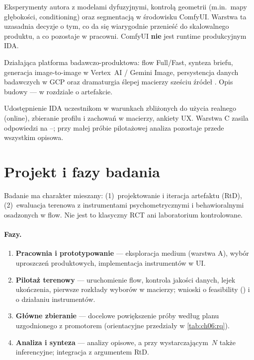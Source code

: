 \begin{description}[style=nextline]
  \item[(A) Praktyka pracowni / ComfyUI]
  Eksperymenty autora z modelami dyfuzyjnymi, kontrolą geometrii (m.in.\ mapy głębokości, conditioning) oraz segmentacją w środowisku ComfyUI. Warstwa ta uzasadnia decyzje o tym, co da się wiarygodnie przenieść do skalowalnego produktu, a co pozostaje w pracowni. ComfyUI \textbf{nie} jest runtime produkcyjnym IDA.

  \item[(B) Artefakt IDA]
  Działająca platforma badawczo-produktowa: flow Full/Fast, synteza briefu, generacja image-to-image w Vertex~AI / Gemini Image, persystencja danych badawczych w GCP oraz dramaturgia ślepej macierzy sześciu źródeł \parencite{idaPlatform2026}. Opis budowy --- w rozdziale o artefakcie.

  \item[(C) Ewaluacja terenowa]
  Udostępnienie IDA uczestnikom w warunkach zbliżonych do użycia realnego (online), zbieranie profilu i zachowań w macierzy, ankiety UX. Warstwa C zasila odpowiedzi na --; przy małej próbie pilotażowej analiza pozostaje przede wszystkim opisowa.
\end{description}

\section{Projekt i fazy badania}
\label{ch06:sec:projekt}

Badanie ma charakter mieszany: (1)~projektowanie i iteracja artefaktu (RtD), (2)~ewaluacja terenowa z instrumentami psychometrycznymi i behawioralnymi osadzonych w flow. Nie jest to klasyczny RCT ani laboratorium kontrolowane.

\paragraph{Fazy.}
\begin{enumerate}
  \item \textbf{Pracownia i prototypowanie} --- eksploracja medium (warstwa A), wybór uproszczeń produktowych, implementacja instrumentów w UI.
  \item \textbf{Pilotaż terenowy} --- uruchomienie flow, kontrola jakości danych, lejek ukończenia, pierwsze rozkłady wyborów w macierzy; wnioski o feasibility () i o działaniu instrumentów.
  \item \textbf{Główne zbieranie} --- docelowe powiększenie próby według planu uzgodnionego z promotorem (orientacyjne przedziały w \cref{tab:ch06:rq}).
  \item \textbf{Analiza i synteza} --- analizy opisowe, a przy wystarczającym~$N$ także inferencyjne; integracja z argumentem RtD.
\end{enumerate}

